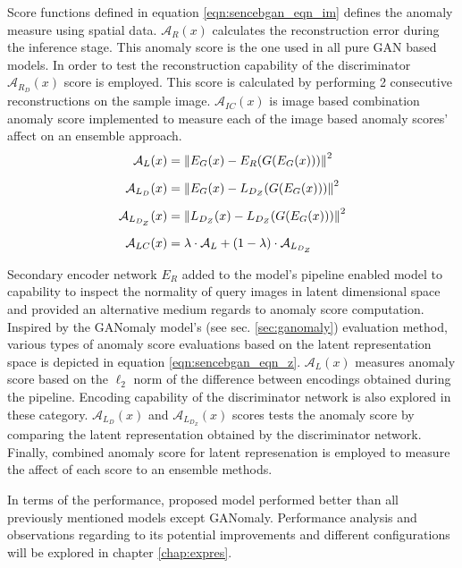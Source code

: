 Score functions defined in equation \ref{eqn:sencebgan_eqn_im} defines the anomaly measure using spatial data. $\mathcal{A}_{R}(x)$ calculates the 
reconstruction error during the inference stage. This anomaly score is the one used in all pure GAN based models. In order to test the 
reconstruction capability of the discriminator $\mathcal{A}_{R_{D}}(x)$ score is employed. This score is calculated by performing 2 consecutive
 reconstructions on the sample image. $\mathcal{A}_{IC}(x)$ is image based combination anomaly score implemented to measure each of the image based 
 anomaly scores' affect on an ensemble approach.
\begin{equation}
	\label{eqn:sencebgan_eqn_z}
	\begin{aligned}
	\mathcal{A}_{L}(x) & = \left\lVert E_{G}(x) - E_{R}(G(E_{G}(x)))\right\rVert^2  \\[5pt]
	\mathcal{A}_{L_{D}}(x) & = \left\lVert E_{G}(x) - L_{D_{Z}}(G(E_{G}(x)))\right\rVert^2 \\[5pt]
	\mathcal{A}_{L_{D_{Z}}}(x) & = \left\lVert L_{D_{Z}}(x) - L_{D_{Z}}(G(E_{G}(x)))\right\rVert^2 \\[5pt]
	\mathcal{A}_{LC}(x) & = \lambda \cdot \mathcal{A}_{L} + (1 - \lambda) \cdot \mathcal{A}_{L_{D_{Z}}} 
	\end{aligned}
\end{equation}

Secondary encoder network $E_{R}$ added to the model's pipeline enabled model to capability to inspect the normality of query images in 
latent dimensional space and provided an alternative medium regards to anomaly score computation. Inspired by the GANomaly model's (see sec.
 \ref{sec:ganomaly}) evaluation method, various types of anomaly score evaluations based on the latent representation space is depicted 
 in equation \ref{eqn:sencebgan_eqn_z}. $\mathcal{A}_{L}(x)$ measures anomaly score based on the $\ell_{2}$ norm of the difference between 
 encodings obtained during the pipeline. Encoding capability of the discriminator network is also explored in these category. 
 $\mathcal{A}_{L_{D}}(x)$ and $\mathcal{A}_{L_{D_{Z}}}(x)$ scores tests the anomaly score by comparing the latent representation obtained 
 by the discriminator network. Finally, combined anomaly score for latent represenation is employed to measure the affect of each score to an 
 ensemble methods. 
 
In terms of the performance, proposed model performed better than all previously mentioned models except GANomaly. Performance analysis and 
observations regarding to its potential improvements and different configurations will be explored in chapter \ref{chap:expres}.


\endgroup

